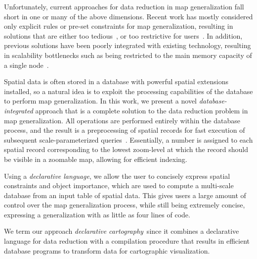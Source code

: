 \documentclass[11pt, oneside]{report}
\begin{document}
Unfortunately, current approaches for data reduction in map generalization fall short in one or many of the above dimensions. Recent work has mostly considered only explicit rules or pre-set constraints for map generalization, resulting in solutions that are either too tedious~\cite{sld,mapnik}, or too restrictive for users~\cite{sarma2012fusiontables,nutanong2012multiresolution}. In addition, previous solutions have been poorly integrated with existing technology, resulting in scalability bottlenecks such as being restricted to the main memory capacity of a single node~\cite{sarma2012fusiontables}. 
 

Spatial data is often stored in a database with powerful spatial extensions installed, so a natural idea is to exploit the processing capabilities of the database to perform map generalization. In this work, we present a novel \emph{database-integrated} approach that is a complete solution to the data reduction problem in map generalization. All operations are performed entirely within the database process, and the result is a preprocessing of spatial records for fast execution of subsequent scale-parameterized queries~\cite{hilbert1891ueber}. Essentially, a number is assigned to each spatial record corresponding to the lowest zoom-level at which the record should be visible in a zoomable map, allowing for efficient indexing.

Using a \emph{declarative language}, we allow the user to concisely express spatial constraints and object importance, which are used to compute a multi-scale database from an input table of spatial data. This gives users a large amount of control over the map generalization process, while still being extremely concise, expressing a generalization with as little as four lines of code. 

We term our approach \emph{declarative cartography}\, since it combines a declarative language for data reduction with a compilation procedure that results in efficient database programs to transform data for cartographic visualization.
\end{document}
